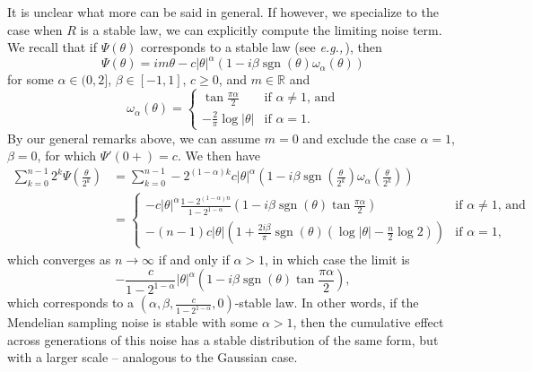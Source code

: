 \documentclass{article}
\newcommand{\eg}{\textit{e.g.,}\,}
\newcommand{\1}{\mathbbm{1}}
\DeclareMathOperator*{\sgn}{sgn}
\theoremstyle{remark}
\theoremstyle{definition}
\begin{document}
It is unclear what more can be said in general. If however, we specialize to the case when $R$ is a stable law, we can explicitly compute the limiting noise term.  We recall that if $\Psi(\theta)$ corresponds to a stable law (see \eg \cite{breiman1992probability}), then
\[
	\Psi(\theta) = im\theta - c|\theta|^{\alpha} (1-i\beta \sgn(\theta)\omega_{\alpha}(\theta))
\]
for some $\alpha \in (0,2]$, $\beta \in [-1,1]$, $c \geq 0$, and $m \in \mathbb{R}$ and
\[
	\omega_{\alpha}(\theta) = \begin{cases}
		\tan{\frac{\pi\alpha}{2}} & \text{if $\alpha \neq 1$, and}\\
		-\frac{2}{\pi}\log{|\theta|} & \text{if $\alpha = 1$.}
	\end{cases}
\]
By our general remarks above, we can assume $m = 0$ and exclude the case $\alpha = 1$, $\beta = 0$, for which  $\Psi'(0+) = c$. We then have
\begin{align*}
	 \sum_{k=0}^{n-1}  {\textstyle 2^{k} \Psi\left(\frac{\theta}{2^{k}}\right)}
	 &=  \sum_{k=0}^{n-1} -2^{(1-\alpha)k} c|\theta|^{\alpha} {\textstyle\left(1-i \beta\sgn\left(\frac{\theta}{2^{k}}\right)
	 	 \omega_{\alpha}\left(\frac{\theta}{2^{k}}\right)\right)}\\
	&= \begin{cases}
		 -c|\theta|^{\alpha}\frac{1-2^{(1-\alpha)n}}{1-2^{1-\alpha}}\left(1-i\beta \sgn(\theta) \tan{\frac{\pi\alpha}{2}}\right) & \text{if $\alpha \neq 1$, and}\\	
         -(n-1) c|\theta| \left(1+\frac{2i\beta}{\pi}\sgn(\theta)\left(\log{|\theta|} - \frac{n}{2} \log{2}\right)\right) & \text{if $\alpha = 1$,}
	\end{cases}
\end{align*}
which converges as $n \to \infty$ if and only if $\alpha > 1$, in which case the limit is 
\begin{equation}\label{eq:stablenoises}
	 -\frac{c}{1-2^{1-\alpha}}|\theta|^{\alpha}\left(1-i\beta \sgn(\theta) \tan{\frac{\pi\alpha}{2}}\right), 
\end{equation}
which corresponds to a $\left(\alpha,\beta, \frac{c}{1-2^{1-\alpha}},0\right)$-stable law.
In other words, if the Mendelian sampling noise is stable with some $\alpha > 1$,
then the cumulative effect across generations of this noise has a stable distribution of the same form,
but with a larger scale -- analogous to the Gaussian case.
\end{document}
